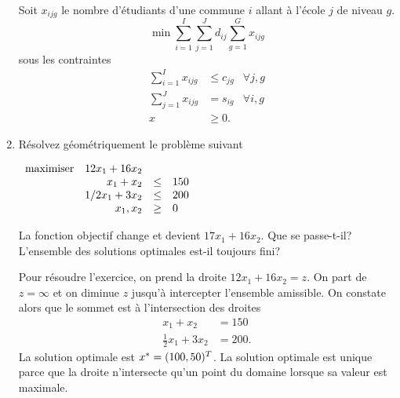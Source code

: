 \begin{enumerate}
    \begin{solution}
      Soit $x_{ijg}$ le nombre d'étudiants d'une commune $i$ allant à l'école $j$ de niveau $g$.
      \[ \min \sum_{i=1}^I \sum_{j=1}^J d_{ij} \sum_{g=1}^G x_{ijg} \]
      sous les contraintes
      \begin{align*}
        \sum_{i=1}^I x_{ijg} & \leq c_{jg} & \forall j, g\\
        \sum_{j=1}^J x_{ijg} & = s_{ig} & \forall i, g\\
        x & \geq 0.
      \end{align*}
    \end{solution}


  \item Résolvez géométriquement le problème suivant

    $
    \begin{array}{lrcl}
      \mbox{maximiser} & 12 x_1+16 x_2\\
      & x_1 + x_2 & \leq & 150\\
      & 1/2 x_1 + 3x_2 & \leq & 200\\
      & x_1, x_2 & \geq & 0
    \end{array}
    $

    La fonction objectif change et devient $17 x_1+16 x_2$. Que se passe-t-il? L'ensemble des solutions optimales est-il toujours fini?
    \begin{solution}
      Pour résoudre l'exercice, on prend la droite $12x_1 + 16x_2 = z$.
      On part de $z = \infty$ et on diminue $z$ jusqu'à intercepter l'ensemble
      amissible.
      On constate alors que le sommet est à l'intersection des droites
      \begin{align*}
        x_{1} + x_{2} & = 150\\
        \frac{1}{2}x_{1} + 3x_{2} & = 200.
      \end{align*}
      La solution optimale est $x^* = (100,50)^{T}$.
      La solution optimale est unique parce que la droite n'intersecte
      qu'un point du domaine lorsque sa valeur est maximale.


\end{solution}
\end{enumerate}
